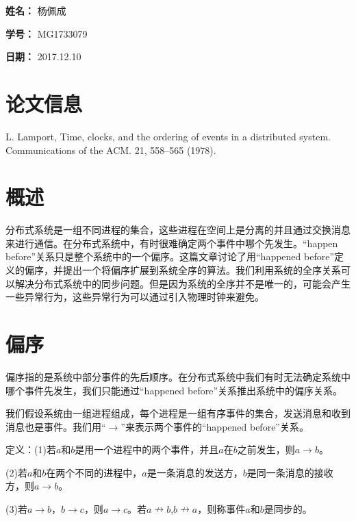 \documentclass[UTF8]{article}
\begin{document}
    
{\flushleft \bf \Large 姓名：} 杨佩成

{\flushleft \bf \Large 学号：} MG1733079

{\flushleft \bf \Large 日期：} 2017.12.10


\section*{论文信息}
    
L. Lamport, Time, clocks, and the ordering of events in a distributed system. Communications of the ACM. 21, 558–565 (1978).


\section{概述}

	分布式系统是一组不同进程的集合，这些进程在空间上是分离的并且通过交换消息来进行通信。在分布式系统中，有时很难确定两个事件中哪个先发生。“happen before”关系只是整个系统中的一个偏序。这篇文章讨论了用“happened before”定义的偏序，并提出一个将偏序扩展到系统全序的算法。我们利用系统的全序关系可以解决分布式系统中的同步问题。但是因为系统的全序并不是唯一的，可能会产生一些异常行为，这些异常行为可以通过引入物理时钟来避免。

\section{偏序}

	偏序指的是系统中部分事件的先后顺序。在分布式系统中我们有时无法确定系统中哪个事件先发生，我们只能通过“happened before”关系推出系统中的偏序关系。

	我们假设系统由一组进程组成，每个进程是一组有序事件的集合，发送消息和收到消息也是事件。我们用“$\to$”来表示两个事件的“happened before”关系。

	定义：(1)若$a$和$b$是用一个进程中的两个事件，并且$a$在$b$之前发生，则$a \to b$。

		(2)若$a$和$b$在两个不同的进程中，$a$是一条消息的发送方，$b$是同一条消息的接收方，则$a \to b$。

		(3)若$a \to b$，$b \to c$，则$a \to c$。若$a \nrightarrow b$,$b \nrightarrow a$，则称事件$a$和$b$是同步的。
\end{document}
